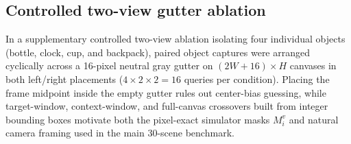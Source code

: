 \subsection{Controlled two-view gutter ablation}
\label{app:early_canvas}
In a supplementary controlled two-view ablation isolating four individual objects (bottle, clock, cup, and backpack), paired object captures were arranged cyclically across a 16-pixel neutral gray gutter on $(2W{+}16)\times H$ canvases in both left/right placements ($4{\times}2{\times}2 = 16$ queries per condition). Placing the frame midpoint inside the empty gutter rules out center-bias guessing, while target-window, context-window, and full-canvas crossovers built from integer bounding boxes motivate both the pixel-exact simulator masks $M_i^v$ and natural camera framing used in the main 30-scene benchmark.
